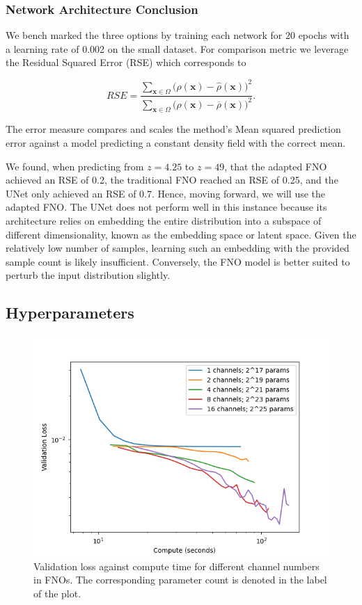 \documentclass{article}
\begin{document}
\subsubsection{Network Architecture Conclusion}

We bench marked the three options by training each network for 20 epochs with a learning rate of 0.002 on the small dataset. For comparison metric we leverage the Residual Squared Error (RSE) which corresponds to 

\begin{equation}
RSE = \frac{\sum_{\mathbf{x} \in \Omega} \bigl(\rho(\mathbf{x}) - \hat{\rho}(\mathbf{x}) \bigr)^2}{\sum_{\mathbf{x} \in \Omega} \bigl(\rho(\mathbf{x}) - \overline{\rho}(\mathbf{x}) \bigr)^2}.
\end{equation}

The error measure compares and scales the method's Mean squared prediction error against a model predicting a constant density field with the correct mean. 

We found, when predicting from $z=4.25$ to $z=49$, that the adapted FNO achieved an RSE of 0.2, the traditional FNO reached an RSE of 0.25, and the UNet only achieved an RSE of 0.7. Hence, moving forward, we will use the adapted FNO. The UNet does not perform well in this instance because its architecture relies on embedding the entire distribution into a subspace of different dimensionality, known as the embedding space or latent space. Given the relatively low number of samples, learning such an embedding with the provided sample count is likely insufficient. Conversely, the FNO model is better suited to perturb the input distribution slightly.

\subsection{Hyperparameters}


\begin{figure}[h]
    \centering
    \includegraphics[width=0.6\linewidth]{img/channels_compute.png}
    \caption{Validation loss against compute time for different channel numbers in FNOs. The corresponding parameter count is denoted in the label of the plot.}
    \label{fig:channels-B}
\end{figure}
\end{document}
